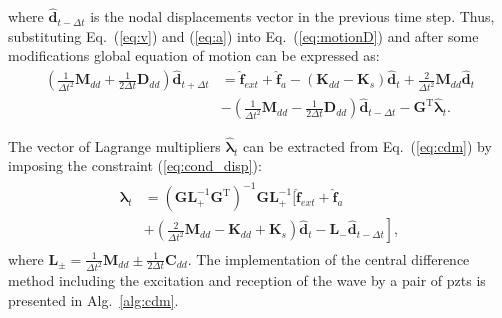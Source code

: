 where \(\widehat{\textbf{d}}_{t-\Delta t}\) is the nodal displacements vector in the previous time step.
Thus, substituting Eq.~(\ref{eq:v}) and (\ref{eq:a}) into Eq.~(\ref{eq:motionD}) and after some modifications global equation of motion can be expressed as:
\begin{equation}
	\begin{split}
		\left(\frac{1}{\Delta t^2}\textbf{M}_{dd}+\frac{1}{2\Delta t}\textbf{D}_{dd} \right)\widehat{\textbf{d}}_{t+\Delta t} & = \widehat{\textbf{f}}_{ext} + \widehat{\textbf{f}}_{a} - \left( \textbf{K}_{dd}-\textbf{K}_s\right)\widehat{\textbf{d}}_t
		+ \frac{2}{\Delta t^2}\textbf{M}_{dd}\widehat{\textbf{d}}_t\\
		&-\left(\frac{1}{\Delta t^2}\textbf{M}_{dd}-\frac{1}{2\Delta t}\textbf{D}_{dd}\right)\widehat{\textbf{d}}_{t-\Delta t}-\textbf{G}^{\mathrm{T}}\widehat{\boldsymbol{\lambda}}_t.
	\end{split}
	\label{eq:cdm}
\end{equation}

The vector of Lagrange multipliers \(\widehat{\boldsymbol{\lambda}}_t\) can be extracted from Eq.~(\ref{eq:cdm}) by imposing the constraint (\ref{eq:cond_disp}): 
\begin{eqnarray}
	\begin{split}
		\widehat{\boldsymbol{\lambda}}_t & = {\left(\textbf{G}\textbf{L}_+^{-1}\textbf{G}^{\mathrm{T}} 	\right)}^{-1}\textbf{G}\textbf{L}_+^{-1} \Bigg[ \widehat{\textbf{f}}_{ext} + \widehat{\textbf{f}}_{a}\\
		& + \left.\left(\frac{2}{\Delta t^2}\textbf{M}_{dd}-\textbf{K}_{dd}+\textbf{K}_s\right)\widehat{\textbf{d}}_t -\textbf{L}_-\widehat{\textbf{d}}_{t-\Delta t} \right],
	\end{split}
	\label{eq:lambda}
\end{eqnarray}
where \(\textbf{L}_{\pm}=\frac{1}{\Delta t^2}\textbf{M}_{dd}\pm\frac{1}{2\Delta t}\textbf{C}_{dd}\).
The implementation of the central difference method including the excitation and reception of the wave by a pair of \acp{pzt} is presented in Alg.~\ref{alg:cdm}.


